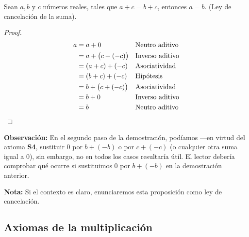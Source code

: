 \documentclass[11pt]{article}
\begin{document}
\begin{enumerate}[label=\alph*)]
    Sean $a,b$ y $c$ números reales, tales que $a+c=b+c$, entonces $a=b$. (Ley de cancelación de la suma).
\vspace{-1em}\begin{proof} 
    \begin{align*}
        a &= a+0 && \text{Neutro aditivo}\\
        &= a+ \bigl(c+(-c)\bigr) && \text{Inverso aditivo}\\
        &= (a+c) + (-c) && \text{Asociatividad}\\
        &= (b+c) + (-c) && \text{Hipótesis}\\
        &= b + \bigl(c+(-c)\bigr) && \text{Asociatividad}\\
        &= b + 0 && \text{Inverso aditivo}\\
        &= b &&\text{Neutro aditivo} \qedhere
    \end{align*}    
\end{proof} \vspace{-1em}

\textbf{Observación:} En el segundo paso de la demostración, podíamos —en virtud del axioma \textbf{S4}, sustituir $0$ por $b+(-b)$ o por $c+(-c)$ (o cualquier otra suma igual a $0$), sin embargo, no en todos los casos resultaría útil. El lector debería comprobar qué ocurre si sustituimos $0$ por $b+(-b)$ en la demostración anterior.

\textbf{Nota:} Si el contexto es claro, enunciaremos esta proposición como ley de cancelación.
\end{enumerate}

\subsection*{Axiomas de la multiplicación}
\end{document}
